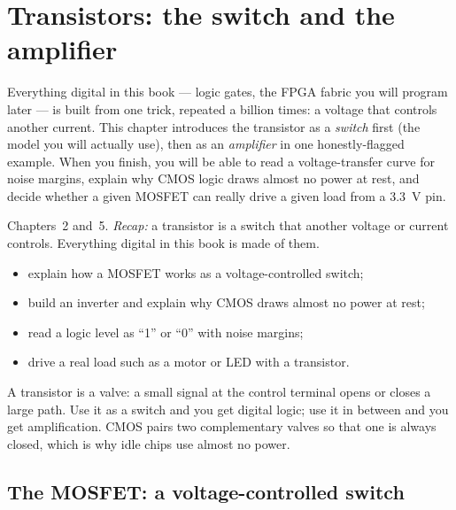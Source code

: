 \chapter{Transistors: the switch and the amplifier}
\label{ch:transistors}

Everything digital in this book — logic gates, the FPGA fabric you will
program later — is built from one trick, repeated a billion times: a voltage
that controls another current. This chapter introduces the transistor as a
\emph{switch} first (the model you will actually use), then as an
\emph{amplifier} in one honestly-flagged example. When you finish, you will
be able to read a voltage-transfer curve for noise margins, explain why CMOS
logic draws almost no power at rest, and decide whether a given MOSFET can
really drive a given load from a \qty{3.3}{\volt} pin.

\begin{rulebox}
Chapters~2 and~5. \emph{Recap:} a transistor is a switch that another voltage or current controls. Everything digital in this book is made of them.
\end{rulebox}
\begin{wins}
\begin{itemize}
\item explain how a MOSFET works as a voltage-controlled switch;
\item build an inverter and explain why CMOS draws almost no power at rest;
\item read a logic level as ``1'' or ``0'' with noise margins;
\item drive a real load such as a motor or LED with a transistor.
\end{itemize}
\end{wins}
\begin{principle}
A transistor is a valve: a small signal at the control terminal opens or closes a large path. Use it as a switch and you get digital logic; use it in between and you get amplification. CMOS pairs two complementary valves so that one is always closed, which is why idle chips use almost no power.
\end{principle}

\section{The MOSFET: a voltage-controlled switch}
\label{sec:mosfet}

